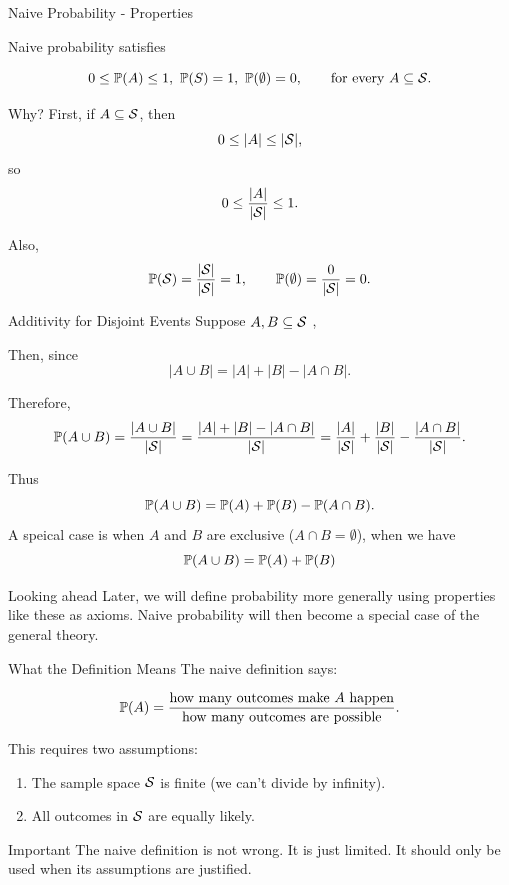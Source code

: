 \begin{frame}{Naive Probability - Properties}


Naive probability satisfies

\[
0 \leq \Prob(A) \leq 1, \ \Prob(S)=1, \ \Prob(\emptyset)=0,
\qquad \text{for every } A \subseteq \Sample.
\]

Why? First, if $A \subseteq \mathcal{S}$, then
\[
0 \leq |A| \leq |\mathcal{S}|,
\]
so
\[
0 \leq \frac{|A|}{|\mathcal{S}|} \leq 1.
\]

Also,
\[
\mathbb{P}(\mathcal{S})=\frac{|\mathcal{S}|}{|\mathcal{S}|}=1,
\qquad
\mathbb{P}(\emptyset)=\frac{0}{|\mathcal{S}|}=0.
\]
\end{frame}

\begin{frame}{Additivity for Disjoint Events}
Suppose $A,B \subseteq \mathcal{S}$ ,

Then, since
\[
|A \cup B| = |A| + |B| - |A\cap B|.
\]

Therefore,
\[
\mathbb{P}(A \cup B)
=
\frac{|A \cup B|}{|\mathcal{S}|}
=
\frac{|A|+|B|-|A\cap B|}{|\mathcal{S}|}
=
\frac{|A|}{|\mathcal{S}|}
+
\frac{|B|}{|\mathcal{S}|}
-
\frac{|A\cap B|}{|\mathcal{S}|}.
\]

Thus
\[
{\mathbb{P}(A \cup B)=\mathbb{P}(A)+\mathbb{P}(B)} -\mathbb{P}(A\cap B).
\]
A speical case is when $A$ and $B$ are exclusive ($A\cap B=\emptyset$), when we have 
\[
{\mathbb{P}(A \cup B)=\mathbb{P}(A)+\mathbb{P}(B)}
\]


\begin{keybox}{Looking ahead}
Later, we will define probability more generally using properties like these as axioms.  
Naive probability will then become a special case of the general theory.
\end{keybox}
\end{frame}

\begin{frame}{What the Definition Means}
The naive definition says:

\[
\mathbb{P}(A)
=
\frac{\text{how many outcomes make } A \text{ happen}}
{\text{how many outcomes are possible}}.
\]

\vspace{0.3cm}

This requires two assumptions:

\begin{enumerate}
    \item The sample space $\mathcal{S}$ is finite (we can't divide by infinity).
    \item All outcomes in $\mathcal{S}$ are equally likely.
\end{enumerate}

\vspace{0.3cm}

\begin{keybox}{Important}
The naive definition is not wrong.  
It is just limited. It should only be used when its assumptions are justified.
\end{keybox}
\end{frame}

